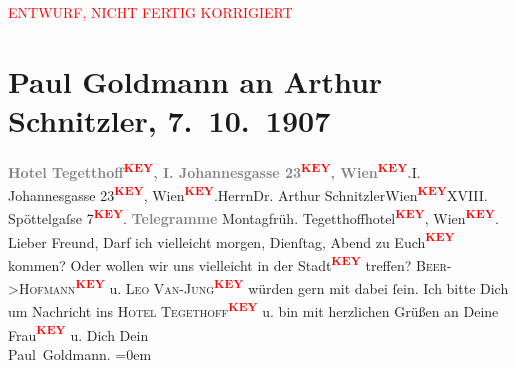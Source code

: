 
\begin{center}
            \textcolor{red}{ENTWURF, NICHT FERTIG KORRIGIERT}
                      \end{center}
            
         \renewcommand{\erwaehnteOrte}{Orte: Wien}
         \renewcommand{\erwaehnteWerke}{}
               \section[Paul Goldmann an Arthur Schnitzler, 7. 10. 1907]{ Paul Goldmann an Arthur Schnitzler, 7. 10. 1907}\nopagebreak{}\rehead{ }\begin{ledgroupsized}[t]{13cm}\normalsize\beginnumbering \toendnotes[C]{\smallbreak\pagebreak[2]} 
\toendnotes[C]{\smallbreak}\pstart{}{\pb}\textcolor{gray}{\textbf{Hotel Tegetthoff\textcolor{red}{\textsuperscript{\textbf{KEY}}}, I.
                        Johannesgasse 23\textcolor{red}{\textsuperscript{\textbf{KEY}}}, Wien\textcolor{red}{\textsuperscript{\textbf{KEY}}}.}}I. Johannesgasse 23\textcolor{red}{\textsuperscript{\textbf{KEY}}}, Wien\textcolor{red}{\textsuperscript{\textbf{KEY}}}.\pend{}{\bigskip}\pstart{}Herrn\pend{}\pstart{}Dr. Arthur Schnitzler\pend{}\pstart{}Wien\textcolor{red}{\textsuperscript{\textbf{KEY}}}\pend{}\pstart{}XVIII. Spöttelgaſse 7\textcolor{red}{\textsuperscript{\textbf{KEY}}}.\pend{}{\bigskip}\pstart
           \noindent{}{\pb}\textcolor{gray}{\textbf{Telegramme}}\pend
           \pstart
           Montagfrüh.\pend
           \pstart
           Tegetthoffhotel\textcolor{red}{\textsuperscript{\textbf{KEY}}}, Wien\textcolor{red}{\textsuperscript{\textbf{KEY}}}.\pend
           \pstart
           Lieber Freund, Darf ich vielleicht morgen, Dienſtag,
                  Abend zu Euch\textcolor{red}{\textsuperscript{\textbf{KEY}}} kommen?
               Oder wollen wir uns vielleicht in der Stadt\textcolor{red}{\textsuperscript{\textbf{KEY}}} treffen? \textsc{Beer->Hofmann\textcolor{red}{\textsuperscript{\textbf{KEY}}}} u. \textsc{Leo Van-Jung\textcolor{red}{\textsuperscript{\textbf{KEY}}}} würden gern mit dabei ſein. Ich bitte Dich um Nachricht ins \textsc{Hotel Tegethoff\textcolor{red}{\textsuperscript{\textbf{KEY}}}} u. bin mit herzlichen Grüßen an Deine Frau\textcolor{red}{\textsuperscript{\textbf{KEY}}} u.
               Dich\pend
           \pstart
           Dein {\\[\baselineskip]}\spacefill\mbox{Paul Goldmann.}\pend
           \leftskip=0em{}
         
         \endnumbering{}\end{ledgroupsized}\begin{anhang}\end{anhang}\newcommand{\dateiname}{L03253}\newcommand{\titel}{Paul Goldmann an Arthur Schnitzler, 7. 10. 1907}\newcommand{\editorInnen}{Martin Anton Müller und Laura Untner}
      